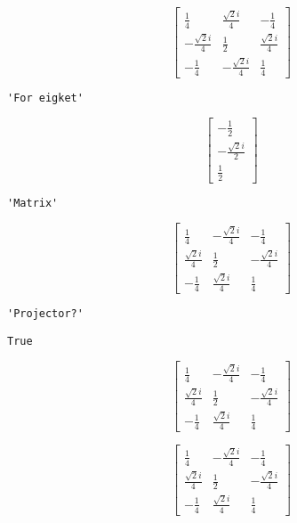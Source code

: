 \documentclass[11pt]{article}
\begin{document}
    
    $$\left[\begin{matrix}\frac{1}{4} & \frac{\sqrt{2} i}{4} & - \frac{1}{4}\\- \frac{\sqrt{2} i}{4} & \frac{1}{2} & \frac{\sqrt{2} i}{4}\\- \frac{1}{4} & - \frac{\sqrt{2} i}{4} & \frac{1}{4}\end{matrix}\right]$$

    
    
    \begin{verbatim}
'For eigket'
    \end{verbatim}

    
    $$\left[\begin{matrix}- \frac{1}{2}\\- \frac{\sqrt{2} i}{2}\\\frac{1}{2}\end{matrix}\right]$$

    
    
    \begin{verbatim}
'Matrix'
    \end{verbatim}

    
    $$\left[\begin{matrix}\frac{1}{4} & - \frac{\sqrt{2} i}{4} & - \frac{1}{4}\\\frac{\sqrt{2} i}{4} & \frac{1}{2} & - \frac{\sqrt{2} i}{4}\\- \frac{1}{4} & \frac{\sqrt{2} i}{4} & \frac{1}{4}\end{matrix}\right]$$

    
    
    \begin{verbatim}
'Projector?'
    \end{verbatim}

    
    
    \begin{verbatim}
True
    \end{verbatim}

    
    $$\left[\begin{matrix}\frac{1}{4} & - \frac{\sqrt{2} i}{4} & - \frac{1}{4}\\\frac{\sqrt{2} i}{4} & \frac{1}{2} & - \frac{\sqrt{2} i}{4}\\- \frac{1}{4} & \frac{\sqrt{2} i}{4} & \frac{1}{4}\end{matrix}\right]$$

    
    $$\left[\begin{matrix}\frac{1}{4} & - \frac{\sqrt{2} i}{4} & - \frac{1}{4}\\\frac{\sqrt{2} i}{4} & \frac{1}{2} & - \frac{\sqrt{2} i}{4}\\- \frac{1}{4} & \frac{\sqrt{2} i}{4} & \frac{1}{4}\end{matrix}\right]$$
\end{document}
